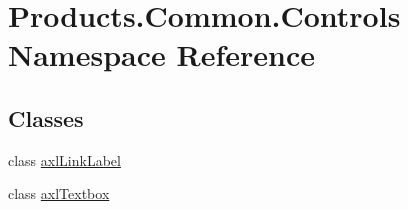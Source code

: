 \hypertarget{namespace_products_1_1_common_1_1_controls}{}\section{Products.\+Common.\+Controls Namespace Reference}
\label{namespace_products_1_1_common_1_1_controls}
\subsection*{Classes}
\begin{DoxyCompactItemize}
\item 
class \hyperlink{class_products_1_1_common_1_1_controls_1_1axl_link_label}{axl\+Link\+Label}
\item 
class \hyperlink{class_products_1_1_common_1_1_controls_1_1axl_textbox}{axl\+Textbox}
\end{DoxyCompactItemize}

